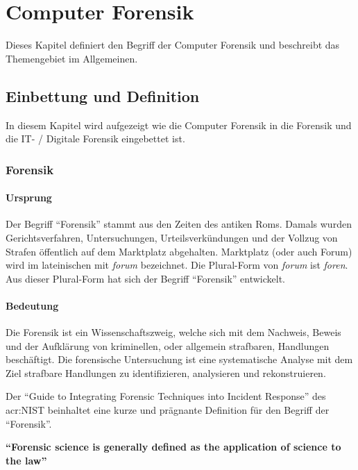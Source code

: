 \chapter{Computer Forensik}\label{chapt:ComputerForensics}

Dieses Kapitel definiert den Begriff der Computer Forensik und beschreibt das Themengebiet im Allgemeinen. 

\section{Einbettung und Definition}
In diesem Kapitel wird aufgezeigt wie die Computer Forensik in die Forensik und die IT- / Digitale Forensik eingebettet ist. 

\subsection{Forensik}
\subsubsection{Ursprung}
Der Begriff "`Forensik"' stammt aus den Zeiten des antiken Roms. Damals wurden Gerichtsverfahren, Untersuchungen, Urteilsverkündungen und der Vollzug von Strafen öffentlich auf dem Marktplatz abgehalten. Marktplatz (oder auch Forum) wird im lateinischen mit \textit{forum} bezeichnet. Die Plural-Form von \textit{forum} ist \textit{foren}. Aus dieser Plural-Form hat sich der Begriff "`Forensik"' entwickelt. \cite{E:Metapedia:Forensik}

\subsubsection{Bedeutung}
Die Forensik ist ein Wissenschaftszweig, welche sich mit dem Nachweis, Beweis und der Aufklärung von kriminellen, oder allgemein strafbaren, Handlungen beschäftigt. Die forensische Untersuchung ist eine systematische Analyse mit dem Ziel strafbare Handlungen zu identifizieren, analysieren und rekonstruieren.

Der "`Guide to Integrating Forensic Techniques into Incident Response"' des \gls{acr:NIST} beinhaltet eine kurze und prägnante Definition für den Begriff der "`Forensik"'.

\begin{center}
\textbf{"`Forensic science is generally defined as the application of science to the law"'} \cite[S. ES-1]{E:2006:NIST:Guide:IncidentResponse}
\end{center}

